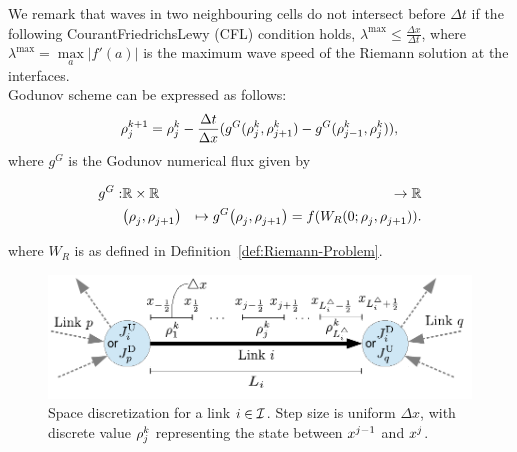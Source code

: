 We remark that waves in two neighbouring cells do not intersect before $\Delta t$ if the following Courant\textendash{}Friedrichs\textendash{}Lewy (CFL) condition holds, $\lambda^{\max}\le\frac{\Delta x}{\Delta t}$, where $\lambda^{\max}=\underset{a}{\max}|f'\left(a\right)|$ is the maximum wave speed of the Riemann solution at the interfaces.\\
Godunov scheme can be expressed as follows:
\begin{equation}
\rho_{j}^{k+1}=\rho_{j}^{k}-\frac{\Delta t}{\Delta x}(g^{G}(\rho_{j}^{k},\rho_{j+1}^{k})-g^{G}(\rho_{j-1}^{k},\rho_{j}^{k})),\label{eq:godscheme}
\end{equation}
where $g^{G}$ is the Godunov numerical flux given by

\begin{eqnarray*}
\god: & \mathbb{R}\times\mathbb{R} & \rightarrow\mathbb{R}\\
 & \left(\discrete{\xind}{},\discrete{\xind+1}{}\right) & \mapsto\god\left(\discrete{\xind}{},\discrete{\xind+1}{}\right)=f(W_{R}(0;\discrete{\xind}{},\discrete{\xind+1}{})).
\end{eqnarray*}

where $W_{R}$ is as defined in Definition~\ref{def:Riemann-Problem}.



\begin{figure}
\begin{centering}
\includegraphics[width=0.6\columnwidth]{previous-articles/adjoint/figs-gen/dx}
\par\end{centering}

\caption{Space discretization for a link $i\in\mathcal{I}$. Step size is uniform
$\Delta x$, with discrete value $\rho_{j}^{k}$ representing
the state between $x^{j-1}$ and $x^{j}$.\label{fig:Space-discretization-for}}


\end{figure}


